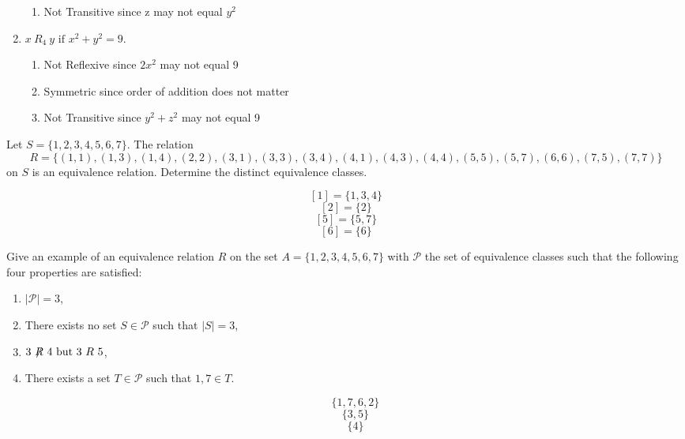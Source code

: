 \documentclass{homework}
\begin{document}
\begin{enumerate}[label=(\alph*)]
\begin{sol}
\begin{enumerate}
              \item Not Transitive since z may not equal $y^2$
            \end{enumerate}
        \end{sol}
	\item $x \ R_4 \ y \text{ if } x^2 + y^2 = 9$.
        \begin{sol}
            \begin{enumerate}
             \item Not Reflexive since $2x^2$ may not equal 9
              \item Symmetric since order of addition does not matter
              \item Not Transitive since $y^2 + z^2$ may not equal 9
            \end{enumerate}
        \end{sol}
\end{enumerate}

\question Let $S = \{1,2,3,4,5,6,7\}$. The relation
\[
	R = \{(1, 1),(1, 3),(1, 4),(2, 2),(3, 1),(3, 3),(3, 4),(4, 1),(4, 3),(4, 4),(5, 5),(5, 7),(6, 6),(7, 5),(7, 7)\}
\]
on $S$ is an equivalence relation. Determine the distinct equivalence classes.

\begin{sol}
  \[[1]=\{1,3,4\}\]
  \[[2]=\{2\}\]
  \[[5]=\{5,7\}\]
  \[[6]=\{6\}\]
\end{sol}

\question Give an example of an equivalence relation $R$ on the set $A = \{1, 2, 3, 4, 5, 6, 7\}$ with $\mathcal{P}$ the set of equivalence classes such that the following four properties are satisfied:

\begin{enumerate}
	\item $|\mathcal{P}| = 3$,
	\item There exists no set $S \in \mathcal{P}$ such that $|S| = 3$,
	\item $3 \ \mathord{\not\mathrel{R}} \ 4 \text{ but } 3 \ R \ 5$,
	\item There exists a set $T \in \mathcal{P}$ such that $1, 7 \in T$.
        \begin{sol}
          \[\{1,7,6,2\}\]
          \[\{3,5\}\]
          \[\{4\}\]
        \end{sol}
\end{enumerate}
\end{document}
